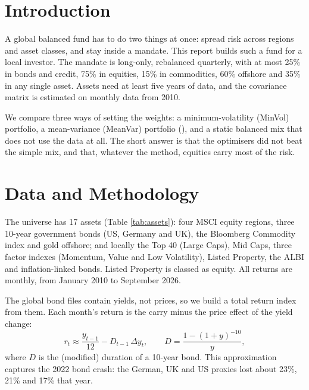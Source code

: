 \documentclass[11pt,preprint]{elsarticle}
\numberwithin{equation}{section}
\numberwithin{figure}{section}
\numberwithin{table}{section}
\begin{document}

\headsep 35pt %




\section{\texorpdfstring{Introduction
\label{Introduction}}{Introduction }}\label{introduction}

A global balanced fund has to do two things at once: spread risk across
regions and asset classes, and stay inside a mandate. This report builds
such a fund for a local investor. The mandate is long-only, rebalanced
quarterly, with at most 25\% in bonds and credit, 75\% in equities, 15\%
in commodities, 60\% offshore and 35\% in any single asset. Assets need
at least five years of data, and the covariance matrix is estimated on
monthly data from 2010.

We compare three ways of setting the weights: a minimum-volatility
(MinVol) portfolio, a mean-variance (MeanVar) portfolio
(), and a static balanced
mix that does not use the data at all. The short answer is that the
optimisers did not beat the simple mix, and that, whatever the method,
equities carry most of the risk.

\section{\texorpdfstring{Data and Methodology
\label{Data}}{Data and Methodology }}\label{data-and-methodology}

The universe has 17 assets (Table \ref{tab:assets}): four MSCI equity
regions, three 10-year government bonds (US, Germany and UK), the
Bloomberg Commodity index and gold offshore; and locally the Top 40
(Large Caps), Mid Caps, three factor indexes (Momentum, Value and Low
Volatility), Listed Property, the ALBI and inflation-linked bonds.
Listed Property is classed as equity. All returns are monthly, from
January 2010 to September 2026.

The global bond files contain yields, not prices, so we build a total
return index from them. Each month's return is the carry minus the price
effect of the yield change: \[
r_t \approx \frac{y_{t-1}}{12} - D_{t-1}\,\Delta y_t, \qquad D = \frac{1-(1+y)^{-10}}{y},
\] where \(D\) is the (modified) duration of a 10-year bond. This
approximation captures the 2022 bond crash: the German, UK and US
proxies lost about 23\%, 21\% and 17\% that year.
\end{document}

